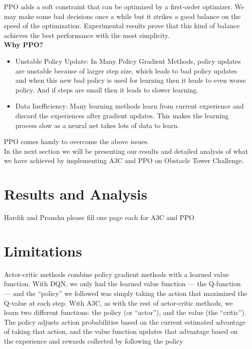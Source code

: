 \documentclass[conference]{IEEEtran}
\begin{document}
PPO adds a soft constraint that can be optimized by a first-order optimizer. We may make some bad decisions once a while but it strikes a good balance on the speed of the optimization. Experimental results prove that this kind of balance achieves the best performance with the most simplicity.\\

\textbf{Why PPO?}\\

\begin{itemize}
\item Unstable Policy Update: In Many Policy Gradient Methods, policy updates are unstable because of larger step size, which leads to bad policy updates and when this new bad policy is used for learning then it leads to even worse policy. And if steps are small then it leads to slower learning. \\
\item Data Inefficiency: Many learning methods learn from current experience and discard the experiences after gradient updates. This makes the learning process slow as a neural net takes lots of data to learn.\\
\end{itemize}

PPO comes handy to overcome the above issues.\\

In the next section we will be presenting our results and detailed analysis of what we have achieved by implementing A3C and PPO on Obstacle Tower Challenge.

\section{Results and Analysis}

Hardik and Pranshu please fill one page each for A3C and PPO

\section{Limitations}

Actor-critic methods combine policy gradient methods with a learned value function. With DQN, we only had the learned value function — the Q-function — and the “policy” we followed was simply taking the action that maximized the Q-value at each step. With A3C, as with the rest of actor-critic methods, we learn two different functions: the policy (or “actor”), and the value (the “critic”). The policy adjusts action probabilities based on the current estimated advantage of taking that action, and the value function updates that advantage based on the experience and rewards collected by following the policy
\end{document}
